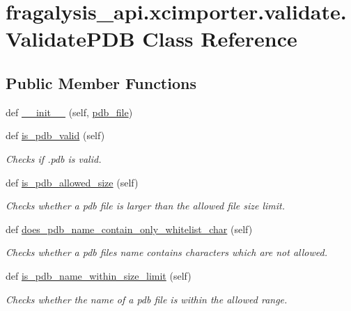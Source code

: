 \hypertarget{classfragalysis__api_1_1xcimporter_1_1validate_1_1_validate_p_d_b}{}\section{fragalysis\+\_\+api.\+xcimporter.\+validate.\+Validate\+P\+DB Class Reference}
\label{classfragalysis__api_1_1xcimporter_1_1validate_1_1_validate_p_d_b}
\subsection*{Public Member Functions}
\begin{DoxyCompactItemize}
\item 
def \hyperlink{classfragalysis__api_1_1xcimporter_1_1validate_1_1_validate_p_d_b_a2b688d0708ea4b2c01e2c436ff11b8b5}{\+\_\+\+\_\+init\+\_\+\+\_\+} (self, \hyperlink{classfragalysis__api_1_1xcimporter_1_1validate_1_1_validate_p_d_b_a9c42b0ed963d65498056ac184793b0f0}{pdb\+\_\+file})
\item 
def \hyperlink{classfragalysis__api_1_1xcimporter_1_1validate_1_1_validate_p_d_b_a7e6b2f1b0ea513e4485fabb411c5f3f5}{is\+\_\+pdb\+\_\+valid} (self)
\begin{DoxyCompactList}\small\item\em Checks if .pdb is valid. \end{DoxyCompactList}\item 
def \hyperlink{classfragalysis__api_1_1xcimporter_1_1validate_1_1_validate_p_d_b_a9e9a8abbb1d90bb2cd17702178831f93}{is\+\_\+pdb\+\_\+allowed\+\_\+size} (self)
\begin{DoxyCompactList}\small\item\em Checks whether a pdb file is larger than the allowed file size limit. \end{DoxyCompactList}\item 
def \hyperlink{classfragalysis__api_1_1xcimporter_1_1validate_1_1_validate_p_d_b_a0775261c2b35a1f1861dabccbba32d02}{does\+\_\+pdb\+\_\+name\+\_\+contain\+\_\+only\+\_\+whitelist\+\_\+char} (self)
\begin{DoxyCompactList}\small\item\em Checks whether a pdb files name contains characters which are not allowed. \end{DoxyCompactList}\item 
def \hyperlink{classfragalysis__api_1_1xcimporter_1_1validate_1_1_validate_p_d_b_a23b89548ce5a6619636348c711b7b27e}{is\+\_\+pdb\+\_\+name\+\_\+within\+\_\+size\+\_\+limit} (self)
\begin{DoxyCompactList}\small\item\em Checks whether the name of a pdb file is within the allowed range. \end{DoxyCompactList}\end{DoxyCompactItemize}
